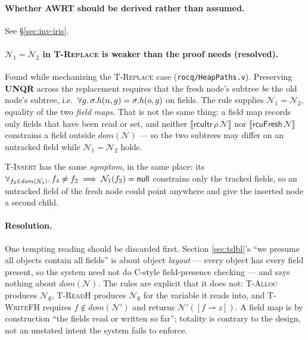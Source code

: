 \paragraph{Whether AWRT should be derived rather than assumed.}
See \S\ref{sec:inv-iris}.

\paragraph{$\mathcal{N}_1 = \mathcal{N}_2$ in \textsc{T-Replace} is weaker than the proof needs (resolved).}
Found while mechanizing the \textsc{T-Replace} case
(\texttt{rocq/HeapPaths.v}).  Preserving \textbf{UNQR} across the replacement
requires that the fresh node's subtree \emph{be} the old node's subtree, i.e.\
$\forall g \ldotp \sigma.h(n,g) = \sigma.h(o,g)$ on \RCU{} fields.  The rule
supplies $\mathcal{N}_1 = \mathcal{N}_2$, equality of the two \emph{field maps}.  That is not the
same thing: a field map records only fields that have been read or set, and
neither $\llbracket \textsf{rcuItr}\,\rho\,\mathcal{N} \rrbracket$ nor $\llbracket
\textsf{rcuFresh}\,\mathcal{N} \rrbracket$ constrains a field outside $dom(\mathcal{N})$ --- so
the two subtrees may differ on an untracked field while $\mathcal{N}_1 = \mathcal{N}_2$ holds.

\textsc{T-Insert} has the same \emph{symptom}, in the same place: its
$\forall_{f_2\in dom(\mathcal{N}_1)} \ldotp f_4 \neq f_2 \implies \mathcal{N}_1(f_2) =
\textsf{null}$ constrains only the tracked fields, so an untracked field of the
fresh node could point anywhere and give the inserted node a second child.

\paragraph{Resolution.}  One tempting reading should be discarded first.  Section
\ref{sec:tslbl}'s ``we presume all objects contain all fields'' is about object
\emph{layout} --- every object has every field present, so the system need not
do C-style field-presence checking --- and says nothing about $dom(\mathcal{N})$.  The
rules are explicit that it does not: \textsc{T-Alloc} produces
$\mathcal{N}_{\emptyset}$, \textsc{T-ReadH} produces $\mathcal{N}_{\emptyset}$ for the
variable it reads into, and \textsc{T-WriteFH} requires $f\notin dom(\mathcal{N}')$ and
returns $\mathcal{N}'([f\rightharpoonup z])$.  A field map is by construction ``the
fields read or written so far''; totality is contrary to the design, not an
unstated intent the system fails to enforce.

